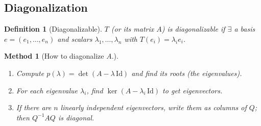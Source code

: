 \documentclass{article}
\newtheorem{definition}{Definition}
\newtheorem{method}{Method}
\begin{document}
\subsection{Diagonalization}
\begin{definition}[Diagonalizable]
    $T$ (or its matrix $A$) is diagonalizable if $\exists$ a basis $e=(e_1,\ldots,e_n)$ and scalars $\lambda_1,\ldots,\lambda_n$ with $T(e_i)=\lambda_ie_i$.
\end{definition}
\begin{method}[How to diagonalize $A$.]
    \begin{enumerate}
        \item Compute $p(\lambda)=\det(A-\lambda\,\mathrm{Id})$ and find its roots (the eigenvalues).
        \item For each eigenvalue $\lambda_i$, find $\ker(A-\lambda_i\,\mathrm{Id})$ to get eigenvectors.
        \item If there are $n$ linearly independent eigenvectors, write them as columns of $Q$; then $Q^{-1}AQ$ is diagonal.
    \end{enumerate}
\end{method}
\end{document}
